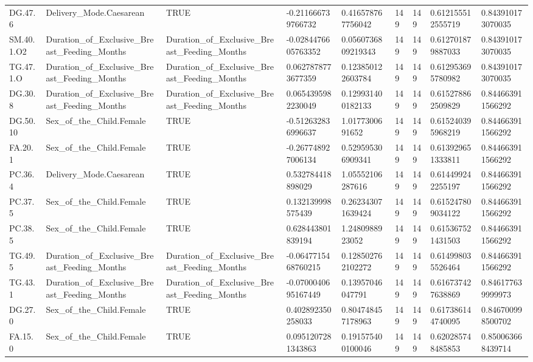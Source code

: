 \begin{longtable}{lllllllll}
DG.47.6 & Delivery\_Mode.Caesarean & TRUE & -0.211666739766732 & 0.416578767756042 & 149 & 149 & 0.612155512555719 & 0.843910173070035 \\
SM.40.1.O2 & Duration\_of\_Exclusive\_Breast\_Feeding\_Months & Duration\_of\_Exclusive\_Breast\_Feeding\_Months & -0.0284476605763352 & 0.0560736809219343 & 149 & 149 & 0.612701879887033 & 0.843910173070035 \\
TG.47.1.O & Duration\_of\_Exclusive\_Breast\_Feeding\_Months & Duration\_of\_Exclusive\_Breast\_Feeding\_Months & 0.0627878773677359 & 0.123850122603784 & 149 & 149 & 0.612953695780982 & 0.843910173070035 \\
DG.30.8 & Duration\_of\_Exclusive\_Breast\_Feeding\_Months & Duration\_of\_Exclusive\_Breast\_Feeding\_Months & 0.0654395982230049 & 0.129931400182133 & 149 & 149 & 0.615278862509829 & 0.844663911566292 \\
DG.50.10 & Sex\_of\_the\_Child.Female & TRUE & -0.512632836996637 & 1.0177300691652 & 149 & 149 & 0.615240395968219 & 0.844663911566292 \\
FA.20.1 & Sex\_of\_the\_Child.Female & TRUE & -0.267748927006134 & 0.529595306909341 & 149 & 149 & 0.613929651333811 & 0.844663911566292 \\
PC.36.4 & Delivery\_Mode.Caesarean & TRUE & 0.532784418898029 & 1.05552106287616 & 149 & 149 & 0.614499242255197 & 0.844663911566292 \\
PC.37.5 & Sex\_of\_the\_Child.Female & TRUE & 0.132139998575439 & 0.262343071639424 & 149 & 149 & 0.615247809034122 & 0.844663911566292 \\
PC.38.5 & Sex\_of\_the\_Child.Female & TRUE & 0.628443801839194 & 1.2480988923052 & 149 & 149 & 0.615367521431503 & 0.844663911566292 \\
TG.49.5 & Duration\_of\_Exclusive\_Breast\_Feeding\_Months & Duration\_of\_Exclusive\_Breast\_Feeding\_Months & -0.0647715468760215 & 0.128502762102272 & 149 & 149 & 0.614998035526464 & 0.844663911566292 \\
TG.43.1 & Duration\_of\_Exclusive\_Breast\_Feeding\_Months & Duration\_of\_Exclusive\_Breast\_Feeding\_Months & -0.0700040695167449 & 0.13957046047791 & 149 & 149 & 0.616737427638869 & 0.846177639999973 \\
DG.27.0 & Sex\_of\_the\_Child.Female & TRUE & 0.402892350258033 & 0.804748457178963 & 149 & 149 & 0.617386144740095 & 0.846700998500702 \\
FA.15.0 & Sex\_of\_the\_Child.Female & TRUE & 0.0951207281343863 & 0.191575400100046 & 149 & 149 & 0.620285748485853 & 0.850063668439714 \\

\end{longtable}
